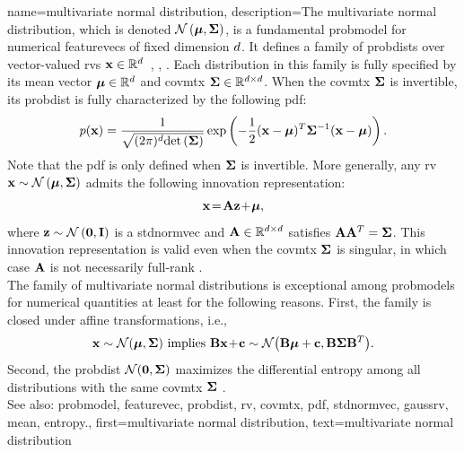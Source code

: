 	
{name={multivariate normal distribution}, 
	description={The multivariate normal distribution, 
 		which is denoted $\mathcal{N}\left({\bm \mu},{\bf \Sigma}\right)$, is a fundamental \gls{probmodel} 
 		for numerical \glspl{featurevec} of fixed dimension $d$. 
 		It defines a family of \glspl{probdist} over vector-valued \glspl{rv} 
 		${\bf x} \in \mathbb{R}^{d}$~\cite{BertsekasProb}, \cite{GrayProbBook}, \cite{Lapidoth09}. 
 		Each distribution in this family is fully specified by its \gls{mean} vector 
 		${\bm \mu} \in \mathbb{R}^{d}$ and \gls{covmtx} ${\bf \Sigma} \in \mathbb{R}^{d \times d}$. 
 		When the \gls{covmtx} ${\bf \Sigma}$ is invertible, its \gls{probdist} is 
 		fully characterized by the following \gls{pdf}:
 		\[
 		p({\bf x}) = 
 		\frac{1}{\sqrt{(2\pi)^{d} {\rm det}\left( {\bf \Sigma} \right)}} 
 		\exp\left( -\frac{1}{2} 
 		({\bf x} - {\bm \mu})^T {\bf \Sigma}^{-1} 
 		({\bf x} - {\bm \mu}) \right).
 		\]
 		Note that the \gls{pdf} is only defined when ${\bf \Sigma}$ is invertible.
     		More generally, any \gls{rv} ${\bf x} \sim \mathcal{N}\left({\bm \mu},{\bf \Sigma}\right)$ 
     		admits the following innovation representation:
		\[{\bf x} \!=\! {\bf A} {\bf z} \!+\!{\bm \mu},
		\]
		where ${\bf z} \sim \mathcal{N}\left(\mathbf{0},\mathbf{I}\right)$ is a \gls{stdnormvec} 
		and ${\bf A} \in \mathbb{R}^{d \times d}$ satisfies ${\bf A} {\bf A}^T = {\bf \Sigma}$. 
		This innovation representation is valid even when the \gls{covmtx} ${\bf \Sigma}$ is singular, 
		in which case ${\bf A}$ is not necessarily full-rank \cite[Ch. 23]{Lapidoth2017}.\\ 
		The family of multivariate normal distributions is exceptional among \glspl{probmodel} for numerical 
		quantities at least for the following reasons. First, the family is closed under affine transformations, i.e., 
		\[ 
		{\bf x} \sim \mathcal{N}({\bm \mu},{\bf \Sigma}) \mbox{ implies } 
		{\bf B}{\bf x}\!+\!{\bf c} \sim \mathcal{N}\big( {\bf B}{\bm \mu}+{\bf c},{\bf B} {\bf \Sigma} {\bf B}^{T} \big). 
		\]
		Second, the \gls{probdist} $\mathcal{N}(\mathbf{0},{\bf \Sigma})$ maximizes the differential \gls{entropy} 
		among all distributions with the same \gls{covmtx} ${\bf \Sigma}$ \cite{coverthomas}. 
		\\ 
		See also: \gls{probmodel}, \gls{featurevec}, \gls{probdist}, \gls{rv}, \gls{covmtx}, \gls{pdf}, \gls{stdnormvec}, \gls{gaussrv}, \gls{mean}, \gls{entropy}.}, 
	first={multivariate normal distribution},
	text={multivariate normal distribution}
}

